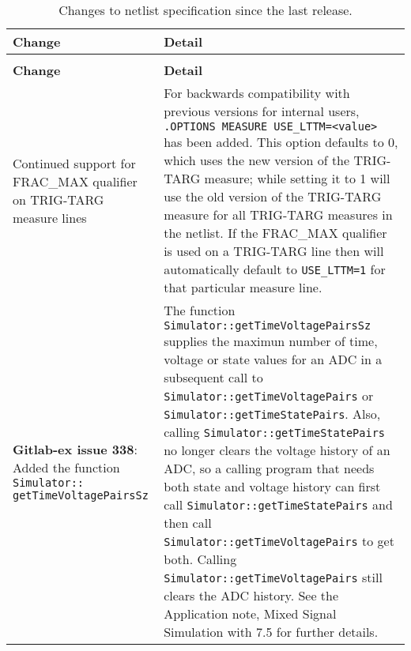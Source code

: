 {
\small

\begin{longtable}[h] {>{\raggedright\small}m{2in}|>{\raggedright\let\\\tabularnewline\small}m{3.5in}}
  \caption{Changes to netlist specification since the last release.\label{newUsage}} \\ \hline
  \rowcolor{XyceDarkBlue}
  \color{white}\textbf{Change} &
  \color{white}\textbf{Detail} \\ \hline \endfirsthead
  \caption[]{Changes to netlist specification since the last release.\label{newUsage}} \\ \hline
  \rowcolor{XyceDarkBlue}
  \color{white}\textbf{Change} &
  \color{white}\textbf{Detail} \\ \hline \endhead

Continued support for FRAC\_MAX qualifier on TRIG-TARG measure lines &
For backwards compatibility with previous \Xyce{} versions for internal
users, \texttt{.OPTIONS MEASURE USE\_LTTM=<value>} has been added.  This
option defaults to 0, which uses the new version of the TRIG-TARG measure;
while setting it to 1 will use the old version of the TRIG-TARG measure
for all TRIG-TARG measures in the netlist.  If the FRAC\_MAX qualifier is
used on a TRIG-TARG line then \Xyce{} will automatically default to
\texttt{USE\_LTTM=1} for that particular measure line.  \\ \hline

\textbf{Gitlab-ex issue 338}: Added the function \texttt{Simulator:: getTimeVoltagePairsSz} & The function
\texttt{Simulator::getTimeVoltagePairsSz} supplies the maximun 
number of time, voltage or state values for an ADC in a subsequent call to 
\texttt{Simulator::getTimeVoltagePairs} or \texttt{Simulator::getTimeStatePairs}.
Also, calling \texttt{Simulator::getTimeStatePairs} no longer clears the voltage
history of an ADC, so a calling program that needs both state and voltage history
can first call \texttt{Simulator::getTimeStatePairs} and then call 
\texttt{Simulator::getTimeVoltagePairs} to get both.  Calling 
\texttt{Simulator::getTimeVoltagePairs} still clears the ADC history.
See the Application note, Mixed Signal Simulation with \Xyce{} 7.5 for further 
details.

\end{longtable}
}
